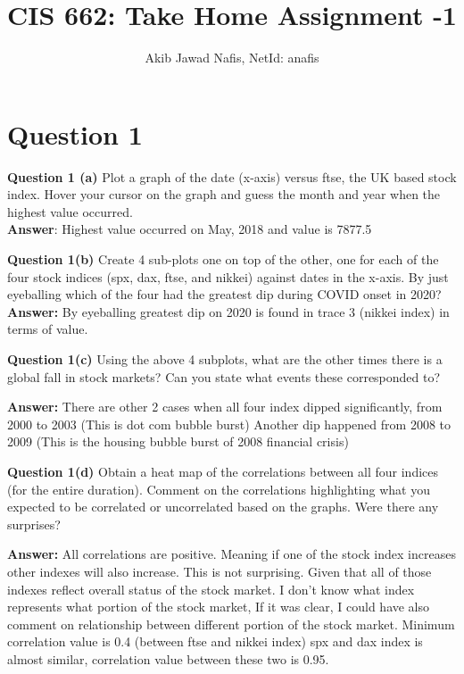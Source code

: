 \documentclass[letterpaper,12pt]{article}
\title{CIS 662: Take Home Assignment -1}
\author{Akib Jawad Nafis, NetId: anafis}
\begin{document}
\maketitle

\newcommand{\showImage} [3] {
	\begin{figure}[H]
		\centering
		\texttt{[image: \#1]}
		\caption{#2}
		\label{fig:#3}
	\end{figure}
}
\section*{Question 1}
\noindent \textbf{Question 1 (a)} Plot a graph of the date (x-axis) versus ftse, the UK based stock index. Hover your cursor on the graph and guess the month and year when the highest value occurred.\\

\textbf{Answer}: Highest value occurred on May, 2018 and value is 7877.5

\noindent \textbf{Question 1(b)}
Create 4 sub-plots one on top of the other, one for each of the four stock indices (spx, dax, ftse, and nikkei) against dates in the x-axis. By just eyeballing which of the four had the greatest dip during COVID onset in 2020? \\

\textbf{Answer:} By eyeballing greatest dip on 2020 is found in trace 3 (nikkei index) in terms of value.

\noindent \textbf{Question 1(c)} Using the above 4 subplots, what are the other times there is a global fall in stock markets? Can you state what events these corresponded to? 

\textbf{Answer:} There are other 2 cases when all four index dipped significantly, from 2000 to 2003 (This is dot com bubble burst)
Another dip happened from 2008 to 2009 (This is the housing bubble burst of 2008 financial crisis)

\noindent \textbf{Question 1(d)} Obtain a heat map of the correlations between all four indices (for the entire duration). Comment on the correlations highlighting what you expected to be correlated or uncorrelated based on the graphs. Were there any surprises? 

\textbf{Answer:} All correlations are positive. Meaning if one of the stock index increases other indexes will also increase. This is not surprising. Given that all of those indexes reflect overall status of the stock market. I don't know what index represents what portion of the stock market, If it was clear, I could have also comment on relationship between different portion of the stock market.  Minimum correlation value is 0.4 (between ftse and nikkei index) spx and dax index is almost similar, correlation value between these two is 0.95.
\end{document}
